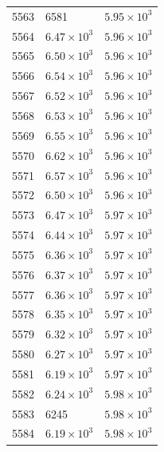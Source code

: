 \begin{table}[H]
\begin{tabular}{lll}
5563 & 6581 & $\displaystyle 5.95 \times 10^{3}$ \\
5564 & $\displaystyle 6.47 \times 10^{3}$ & $\displaystyle 5.96 \times 10^{3}$ \\
5565 & $\displaystyle 6.50 \times 10^{3}$ & $\displaystyle 5.96 \times 10^{3}$ \\
5566 & $\displaystyle 6.54 \times 10^{3}$ & $\displaystyle 5.96 \times 10^{3}$ \\
5567 & $\displaystyle 6.52 \times 10^{3}$ & $\displaystyle 5.96 \times 10^{3}$ \\
5568 & $\displaystyle 6.53 \times 10^{3}$ & $\displaystyle 5.96 \times 10^{3}$ \\
5569 & $\displaystyle 6.55 \times 10^{3}$ & $\displaystyle 5.96 \times 10^{3}$ \\
5570 & $\displaystyle 6.62 \times 10^{3}$ & $\displaystyle 5.96 \times 10^{3}$ \\
5571 & $\displaystyle 6.57 \times 10^{3}$ & $\displaystyle 5.96 \times 10^{3}$ \\
5572 & $\displaystyle 6.50 \times 10^{3}$ & $\displaystyle 5.96 \times 10^{3}$ \\
5573 & $\displaystyle 6.47 \times 10^{3}$ & $\displaystyle 5.97 \times 10^{3}$ \\
5574 & $\displaystyle 6.44 \times 10^{3}$ & $\displaystyle 5.97 \times 10^{3}$ \\
5575 & $\displaystyle 6.36 \times 10^{3}$ & $\displaystyle 5.97 \times 10^{3}$ \\
5576 & $\displaystyle 6.37 \times 10^{3}$ & $\displaystyle 5.97 \times 10^{3}$ \\
5577 & $\displaystyle 6.36 \times 10^{3}$ & $\displaystyle 5.97 \times 10^{3}$ \\
5578 & $\displaystyle 6.35 \times 10^{3}$ & $\displaystyle 5.97 \times 10^{3}$ \\
5579 & $\displaystyle 6.32 \times 10^{3}$ & $\displaystyle 5.97 \times 10^{3}$ \\
5580 & $\displaystyle 6.27 \times 10^{3}$ & $\displaystyle 5.97 \times 10^{3}$ \\
5581 & $\displaystyle 6.19 \times 10^{3}$ & $\displaystyle 5.97 \times 10^{3}$ \\
5582 & $\displaystyle 6.24 \times 10^{3}$ & $\displaystyle 5.98 \times 10^{3}$ \\
5583 & 6245 & $\displaystyle 5.98 \times 10^{3}$ \\
5584 & $\displaystyle 6.19 \times 10^{3}$ & $\displaystyle 5.98 \times 10^{3}$ \\

\end{tabular}
\end{table}

